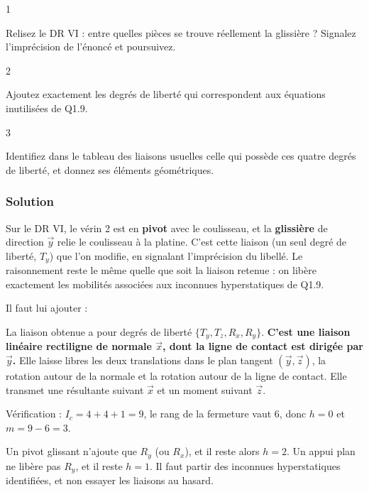 \documentclass[11pt,a4paper]{article}
\newcommand{\equationajustee}[1]{%
  \sbox{\boiteequation}{$\displaystyle #1$}%
  \ifdim\wd\boiteequation>\linewidth
    \[\resizebox{\linewidth}{!}{\usebox{\boiteequation}}\]%
  \else
    \[#1\]%
  \fi}
\begin{document}
\begin{indication}{1}

Relisez le DR VI : entre quelles pièces se trouve réellement la glissière ? Signalez l'imprécision de l'énoncé et poursuivez.

\end{indication}

\begin{indication}{2}

Ajoutez exactement les degrés de liberté qui correspondent aux équations inutilisées de Q1.9.

\end{indication}

\begin{indication}{3}

Identifiez dans le tableau des liaisons usuelles celle qui possède ces quatre degrés de liberté, et donnez ses éléments géométriques.

\end{indication}

\hypertarget{solution-9}{%
\subsubsection{Solution}\label{solution-9}}

Sur le DR VI, le vérin 2 est en \textbf{pivot} avec le coulisseau, et la \textbf{glissière} de direction \(\vec y\) relie le coulisseau à la platine. C'est cette liaison (un seul degré de liberté, \(T_y\)) que l'on modifie, en signalant l'imprécision du libellé. Le raisonnement reste le même quelle que soit la liaison retenue : on libère exactement les mobilités associées aux inconnues hyperstatiques de Q1.9.

Il faut lui ajouter :

\equationajustee{\boxed{T_z,\quad R_x,\quad R_y}}

La liaison obtenue a pour degrés de liberté \(\{T_y, T_z, R_x, R_y\}\). \textbf{C'est une liaison linéaire rectiligne de normale \(\vec x\), dont la ligne de contact est dirigée par \(\vec y\).} Elle laisse libres les deux translations dans le plan tangent \((\vec y,\vec z)\), la rotation autour de la normale et la rotation autour de la ligne de contact. Elle transmet une résultante suivant \(\vec x\) et un moment suivant \(\vec z\).

Vérification : \(I_c = 4 + 4 + 1 = 9\), le rang de la fermeture vaut 6, donc \(h = 0\) et \(m = 9 - 6 = 3\).

\begin{piege}

Un pivot glissant n'ajoute que \(R_y\) (ou \(R_x\)), et il reste alors \(h = 2\). Un appui plan ne libère pas \(R_y\), et il reste \(h = 1\). Il faut partir des inconnues hyperstatiques identifiées, et non essayer les liaisons au hasard.

\end{piege}
\end{document}
